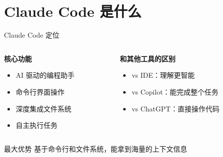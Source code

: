 \documentclass[aspectratio=169,xcolor=dvipsnames]{beamer}
\begin{document}
\section{Claude Code 是什么}

\begin{frame}{Claude Code 定位}
  \begin{columns}
    \begin{column}{0.48\textwidth}
      \textbf{核心功能}
      \begin{itemize}
        \item AI 驱动的编程助手
        \item 命令行界面操作
        \item 深度集成文件系统
        \item 自主执行任务
      \end{itemize}
    \end{column}
    \begin{column}{0.48\textwidth}
      \textbf{和其他工具的区别}
      \begin{itemize}
        \item vs IDE：理解更智能
        \item vs Copilot：能完成整个任务
        \item vs ChatGPT：直接操作代码
      \end{itemize}
    \end{column}
  \end{columns}

  \vspace{0.5cm}

  \begin{block}{最大优势}
    基于命令行和文件系统，能拿到海量的上下文信息
  \end{block}
\end{frame}
\end{document}
